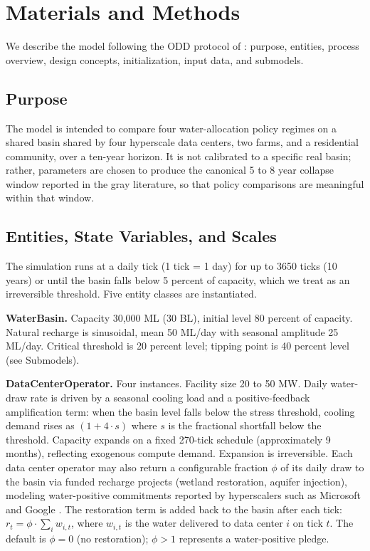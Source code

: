 \documentclass[sigconf,nonacm]{acmart}
\begin{document}
\section{Materials and Methods}

We describe the model following the ODD protocol of \citet{grimm2020odd}: purpose, entities, process overview, design concepts, initialization, input data, and submodels.

\subsection{Purpose}
The model is intended to compare four water-allocation policy regimes on a shared basin shared by four hyperscale data centers, two farms, and a residential community, over a ten-year horizon. It is not calibrated to a specific real basin; rather, parameters are chosen to produce the canonical 5 to 8 year collapse window reported in the gray literature, so that policy comparisons are meaningful within that window.

\subsection{Entities, State Variables, and Scales}
The simulation runs at a daily tick (1 tick = 1 day) for up to 3650 ticks (10 years) or until the basin falls below 5 percent of capacity, which we treat as an irreversible threshold. Five entity classes are instantiated.

\textbf{WaterBasin.} Capacity 30{,}000 ML (30 BL), initial level 80 percent of capacity. Natural recharge is sinusoidal, mean 50 ML/day with seasonal amplitude 25 ML/day. Critical threshold is 20 percent level; tipping point is 40 percent level (see Submodels).

\textbf{DataCenterOperator.} Four instances. Facility size 20 to 50 MW. Daily water-draw rate is driven by a seasonal cooling load and a positive-feedback amplification term: when the basin level falls below the stress threshold, cooling demand rises as $(1 + 4 \cdot s)$ where $s$ is the fractional shortfall below the threshold. Capacity expands on a fixed 270-tick schedule (approximately 9 months), reflecting exogenous compute demand. Expansion is irreversible. Each data center operator may also return a configurable fraction $\phi$ of its daily draw to the basin via funded recharge projects (wetland restoration, aquifer injection), modeling water-positive commitments reported by hyperscalers such as Microsoft and Google \citep{microsoft2022environmental,google2023environmental}. The restoration term is added back to the basin after each tick: $r_t = \phi \cdot \sum_i w_{i,t}$, where $w_{i,t}$ is the water delivered to data center $i$ on tick $t$. The default is $\phi = 0$ (no restoration); $\phi > 1$ represents a water-positive pledge.
\end{document}
